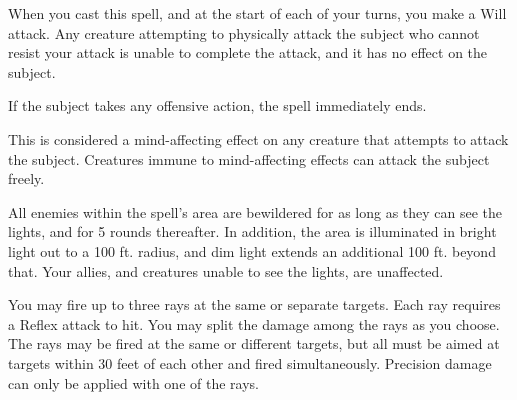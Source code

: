 \spelldur{\durshort}
\spelleffect When you cast this spell, and at the start of each of your turns, you make a Will attack. Any creature attempting to physically attack the subject who cannot resist your attack is unable to complete the attack, and it has no effect on the subject.

If the subject takes any offensive action, the spell immediately ends.

\spellnotes This is considered a mind-affecting effect on any creature that attempts to attack the subject. Creatures immune to mind-affecting effects can attack the subject freely.

\begin{comment}
\subsubsection{S}
\end{comment}

\spelldur{\durshort}
\spelleffect All enemies within the spell's area are bewildered for as long as they can see the lights, and for 5 rounds thereafter. In addition, the area is illuminated in bright light out to a 100 ft. radius, and dim light extends an additional 100 ft. beyond that.
\spellnotes Your allies, and creatures unable to see the lights, are unaffected.

\spelleffect You may fire up to three rays at the same or separate targets. Each ray requires a Reflex attack to hit. You may split the damage among the rays as you choose. The rays may be fired at the same or different targets, but all must be aimed at targets within 30 feet of each other and fired simultaneously. Precision damage can only be applied with one of the rays.

